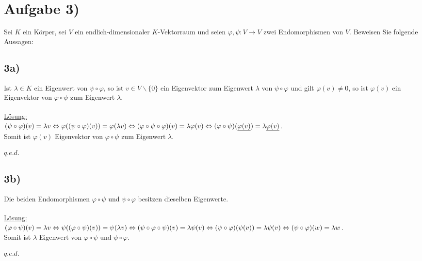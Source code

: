 \documentclass[a4paper]{article}
\newcommand{\ul}{\underline}
\renewcommand{\qed}{\begin{flushright}
\ul{\(q.e.d.\)}
\end{flushright}}
\let\phi\varphi
\begin{document}
\section*{Aufgabe 3)}
Sei \(K\) ein Körper, sei \(V\) ein endlich-dimensionaler \(K\)-Vektorraum und seien \(\phi,\psi:V\rightarrow V\) zwei Endomorphismen  von \(V\). Beweisen Sie folgende Aussagen:
\subsection*{3a)}
Ist \(\lambda \in K\) ein Eigenwert von \(\psi\circ\phi\), so ist \(v\in V\backslash\{0\}\) ein Eigenvektor zum Eigenwert \(\lambda\) von \(\psi\circ\phi\) und gilt \(\phi(v)\neq 0\), so ist \(\phi(v)\) ein Eigenvektor von \(\phi\circ\psi\) zum Eigenwert \(\lambda\).\\\\
\ul{Lösung:}\\
\((\psi\circ\phi)(v)=\lambda v\\
\Leftrightarrow \phi((\psi\circ\phi)(v))=\phi(\lambda v)\\
\Leftrightarrow (\phi\circ\psi\circ\phi)(v)=\lambda\phi(v)\\
\Leftrightarrow (\phi\circ\psi)(\ul{\phi(v)})=\lambda\ul{\phi(v)}\).\\
Somit ist \(\phi(v)\) Eigenvektor von \(\phi\circ\psi\) zum Eigenwert \(\lambda\).
\qed
\subsection*{3b)}
Die beiden Endomorphismen \(\phi\circ\psi\) und \(\psi\circ\phi\) besitzen dieselben Eigenwerte.\\\\
\ul{Lösung:}\\
\((\phi\circ\psi)(v)=\lambda v\\
\Leftrightarrow \psi((\phi\circ\psi)(v))=\psi(\lambda v)\\
\Leftrightarrow (\psi\circ\phi\circ\psi)(v)=\lambda\psi(v)\\
\Leftrightarrow (\psi\circ\phi)(\psi(v))=\lambda\psi(v)\\
\Leftrightarrow (\psi\circ\phi)(w)=\lambda w\).\\
Somit ist \(\lambda\) Eigenwert von \(\phi\circ\psi\) und \(\psi\circ\phi\).
\qed
\end{document}
